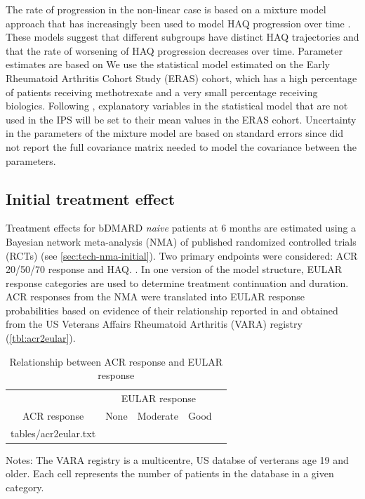 \documentclass[11pt,final,fleqn]{article}\usepackage[]{graphicx}\usepackage[]{color}
\makeatletter
\theoremstyle{plain}
\newcommand*\ExpandableInput[1]{\@@input#1 }
\makeatother
\begin{document}
The rate of progression in the non-linear case is based on a mixture model approach that has increasingly been used to model HAQ progression over time \citep{stevenson2016adalimumab, norton2013trajectories, norton2014health}. These models suggest that different subgroups have distinct HAQ trajectories and that the rate of worsening of HAQ progression decreases over time. Parameter estimates are based on We use the statistical model estimated on the Early Rheumatoid Arthritis Cohort Study (ERAS) cohort, which has a high percentage of patients receiving methotrexate and a very small percentage receiving biologics. Following \citet{stevenson2016adalimumab}, explanatory variables in the statistical model that are not used in the IPS will be set to their mean values in the ERAS cohort. Uncertainty in the parameters of the mixture model are based on standard errors since \citet{norton2013trajectories} did not report the full covariance matrix needed to model the covariance between the parameters.

\subsection{Initial treatment effect}\label{initial-treatment-effect}

Treatment effects for bDMARD \emph{naive} patients at 6 months are
estimated using a Bayesian network meta-analysis (NMA) of published
randomized controlled trials (RCTs) (see \autoref{sec:tech-nma-initial}).
Two primary endpoints were considered: ACR 20/50/70 response and HAQ.
. In one version of the model
structure, EULAR response categories are used to determine treatment
continuation and duration. ACR responses from the NMA were translated
into EULAR response probabilities based on evidence of their
relationship reported in \citet{stevenson2016adalimumab} and obtained
from the US Veterans Affairs Rheumatoid Arthritis (VARA) registry
(\autoref{tbl:acr2eular}).



\begin{table}[!ht]
\begin{center}
\begin{threeparttable}
\caption{Relationship between ACR response and EULAR response} \label{tbl:acr2eular}
\begin{tabularx}{\textwidth}{@{\extracolsep{\fill}}lcccc}
\hline
\multicolumn{1}{l}{} & \multicolumn{3}{c}{EULAR response} \\
\cmidrule{2-4} 
\multicolumn{1}{c}{ACR response} & \multicolumn{1}{c}{None} & \multicolumn{1}{c}{Moderate} & \multicolumn{1}{c}{Good} \\
\hline
\ExpandableInput{tables/acr2eular.txt}
\hline
\end{tabularx}
\scriptsize
Notes: The VARA registry is a multicentre, US databse of verterans age 19 and older. Each cell represents the number of patients in the 
database in a given category. 
\end{threeparttable}
\end{center}
\end{table}
\end{document}
